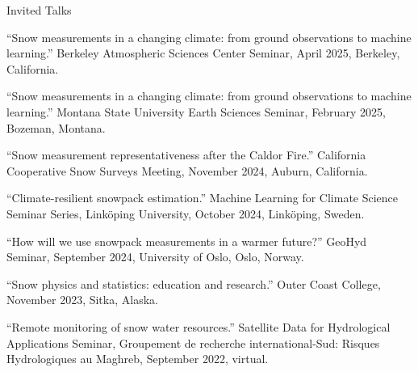 \documentclass{cv}
\begin{document}
\begin{cSection}{Invited Talks}
\item ``Snow measurements in a changing climate: from ground observations to machine learning.'' Berkeley Atmospheric Sciences Center Seminar, April 2025, Berkeley, California.
\item ``Snow measurements in a changing climate: from ground observations to machine learning.'' Montana State University Earth Sciences Seminar, February 2025, Bozeman, Montana.
\item ``Snow measurement representativeness after the Caldor Fire.'' California Cooperative Snow Surveys Meeting, November 2024, Auburn, California.
\item ``Climate-resilient snowpack estimation.'' Machine Learning for Climate Science Seminar Series, Link\"oping University, October 2024, Link\"oping, Sweden.
\item ``How will we use snowpack measurements in a warmer future?'' GeoHyd Seminar, September 2024, University of Oslo, Oslo, Norway.
\item ``Snow physics and statistics: education and research.'' Outer Coast College, November 2023, Sitka, Alaska. 
\item  ``Remote monitoring of snow water resources.'' Satellite Data for Hydrological Applications Seminar, Groupement de recherche international-Sud: Risques Hydrologiques au Maghreb, September 2022, virtual.
\end{cSection}
\end{document}
